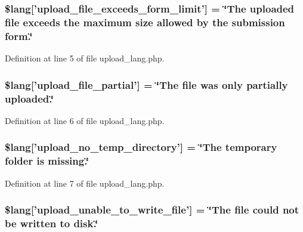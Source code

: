 \subsubsection[{\$lang}]{\setlength{\rightskip}{0pt plus 5cm}\$lang['upload\-\_\-file\-\_\-exceeds\-\_\-form\-\_\-limit'] = \char`\"{}The uploaded file exceeds the maximum size allowed by the submission form.\char`\"{}}\label{upload__lang_8php_af6f65d563af150d50dfc6957079fd529}


Definition at line 5 of file upload\-\_\-lang.\-php.

\subsubsection[{\$lang}]{\setlength{\rightskip}{0pt plus 5cm}\$lang['upload\-\_\-file\-\_\-partial'] = \char`\"{}The file was only partially uploaded.\char`\"{}}\label{upload__lang_8php_a79751b02ce35007a90bd9052f83deed9}


Definition at line 6 of file upload\-\_\-lang.\-php.

\subsubsection[{\$lang}]{\setlength{\rightskip}{0pt plus 5cm}\$lang['upload\-\_\-no\-\_\-temp\-\_\-directory'] = \char`\"{}The temporary folder is missing.\char`\"{}}\label{upload__lang_8php_ac7144f4992346816875bac28488ef715}


Definition at line 7 of file upload\-\_\-lang.\-php.

\subsubsection[{\$lang}]{\setlength{\rightskip}{0pt plus 5cm}\$lang['upload\-\_\-unable\-\_\-to\-\_\-write\-\_\-file'] = \char`\"{}The file could {\bf not} be written {\bf to} disk.\char`\"{}}\label{upload__lang_8php_a620b622468d4e7781fed6316440c85e7}


